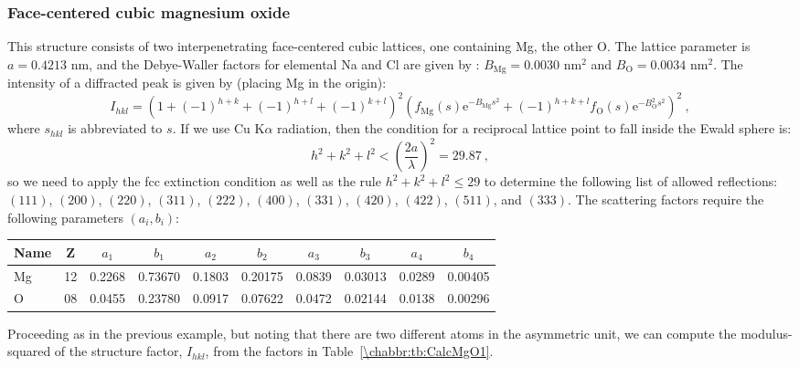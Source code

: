 \subsubsection{Face-centered cubic magnesium oxide}
This structure consists of two interpenetrating face-centered cubic lattices, one containing Mg, the other O. The lattice parameter is $a=0.4213$ nm, and the Debye-Waller factors for elemental Na and Cl are given by \cite{lawrence1973a}: $B_{\text{Mg}}=0.0030$ nm$^2$ and  $B_{\text{O}}=0.0034$ nm$^2$. The intensity of a diffracted peak is given by (placing Mg in the origin):
\[
	I_{hkl} = \left(1+(-1)^{h+k}+(-1)^{h+l}+(-1)^{k+l}\right)^2 \left( f_{\text{Mg}}(s)\mathrm{e}^{-B_{\text{Mg}}s^2} + (-1)^{h+k+l}f_{\text{O}}(s)\mathrm{e}^{-B_{\text{O}}^2s^2}   \right)^2\ ,
\]
where $s_{hkl}$ is abbreviated to $s$.  If we use Cu K$\alpha$ radiation, then the condition for a reciprocal lattice point to fall inside the Ewald sphere is:
\[
	h^2+k^2+l^2 < \left(\frac{2a}{\lambda}\right)^2 = 29.87\ ,
\]
so we need to apply the fcc extinction condition as well as the rule $h^2+k^2+l^2\le 29$ to determine the following list of allowed reflections: $(111)$, $(200)$, $(220)$, $(311)$, $(222)$, $(400)$, $(331)$, $(420)$, $(422)$, $(511)$, and $(333)$.   The scattering factors require the following parameters $(a_i,b_i)$:
\begin{center}
\begin{tabular}{|l|c|cccccccc|}
\hline
Name&Z &$a_1$&$b_1$&$a_2$&$b_2$&$a_3$&$b_3$&$a_4$&$b_4$\\
\hline\hline
Mg &12&0.2268& 0.73670 &0.1803 &0.20175 &0.0839 &0.03013 &0.0289&0.00405\\
O &08&0.0455& 0.23780 &0.0917 & 0.07622 &0.0472 &0.02144 &0.0138 &0.00296\\
\hline
\end{tabular}
\end{center}

Proceeding as in the previous example, but noting that there are two different atoms in the asymmetric unit, we can compute the modulus-squared of the structure factor, $I_{hkl}$, from the factors in Table~\ref{\chabbr:tb:CalcMgO1}.

